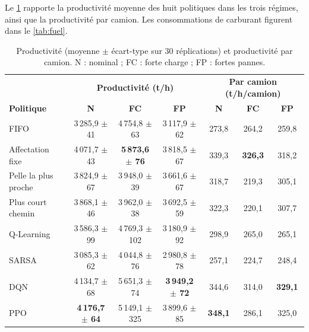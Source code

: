 \documentclass[11pt,a4paper]{article}
\newif\ifrevmarks
\newcommand{\revtag}[1]{\ifrevmarks\textsuperscript{\textcolor{red!70!black}{\scriptsize[#1]}}\fi}
\newcommand{\rev}[2]{\ifrevmarks{\color{revcolor}#2}\revtag{#1}\else#2\fi}
\begin{document}
Le \cref{tab:productivity} rapporte la productivité moyenne des huit politiques dans les trois régimes, ainsi que la productivité par camion. \rev{m16}{Les consommations de carburant figurent dans le \cref{tab:fuel}.}

\begin{table}[H]
\centering
\caption{Productivité (moyenne $\pm$ écart-type sur 30 réplications) et productivité par camion. N : nominal ; FC : forte charge ; FP : fortes pannes.}
\label{tab:productivity}
\footnotesize\setlength{\tabcolsep}{3pt}
\begin{tabular}{@{}lccc|ccc@{}}
\toprule
 & \multicolumn{3}{c|}{\textbf{Productivité (t/h)}} & \multicolumn{3}{c}{\rev{M15}{\textbf{Par camion (t/h/camion)}}} \\
\textbf{Politique} & \textbf{N} & \textbf{FC} & \textbf{FP} & \textbf{N} & \textbf{FC} & \textbf{FP} \\
\midrule
FIFO                 & 3\,285,9 $\pm$ 41 & 4\,754,8 $\pm$ 63  & 3\,117,9 $\pm$ 62 & 273,8 & 264,2 & 259,8 \\
Affectation fixe     & 4\,071,7 $\pm$ 43 & \textbf{5\,873,6 $\pm$ 76} & 3\,818,5 $\pm$ 67 & 339,3 & \textbf{326,3} & 318,2 \\
Pelle la plus proche & 3\,824,9 $\pm$ 67 & 3\,948,0 $\pm$ 39  & 3\,661,6 $\pm$ 67 & 318,7 & 219,3 & 305,1 \\
Plus court chemin    & 3\,868,1 $\pm$ 46 & 3\,962,0 $\pm$ 38  & 3\,692,5 $\pm$ 59 & 322,3 & 220,1 & 307,7 \\
Q-Learning           & 3\,586,3 $\pm$ 99 & 4\,769,3 $\pm$ 102 & 3\,180,9 $\pm$ 92 & 298,9 & 265,0 & 265,1 \\
SARSA                & 3\,085,3 $\pm$ 62 & 4\,044,8 $\pm$ 76  & 2\,980,8 $\pm$ 78 & 257,1 & 224,7 & 248,4 \\
DQN                  & 4\,134,7 $\pm$ 68 & 5\,651,3 $\pm$ 74  & \textbf{3\,949,2 $\pm$ 72} & 344,6 & 314,0 & \textbf{329,1} \\
PPO                  & \textbf{4\,176,7 $\pm$ 64} & 5\,149,1 $\pm$ 325 & 3\,899,6 $\pm$ 85 & \textbf{348,1} & 286,1 & 325,0 \\
\bottomrule
\end{tabular}
\end{table}
\end{document}
